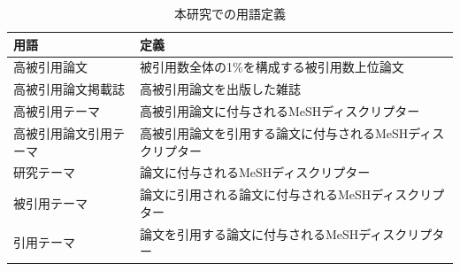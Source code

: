 \begin{table}[h]
\begin{center}
\caption{本研究での用語定義} \label{tab:def}
{\small
\begin{tabular}{lp{32mm}}
  用語 & 定義 \\
  \hline 
  高被引用論文 & 被引用数全体の1\%を構成する被引用数上位論文 \\
  高被引用論文掲載誌 & 高被引用論文を出版した雑誌 \\
  高被引用テーマ & 高被引用論文に付与されるMeSHディスクリプター \\
  高被引用論文引用テーマ & 高被引用論文を引用する論文に付与されるMeSHディスクリプター \\
  研究テーマ & 論文に付与されるMeSHディスクリプター \\
  被引用テーマ & 論文に引用される論文に付与されるMeSHディスクリプター \\
  引用テーマ & 論文を引用する論文に付与されるMeSHディスクリプター \\
\end{tabular}
}
\end{center}
\end{table}
